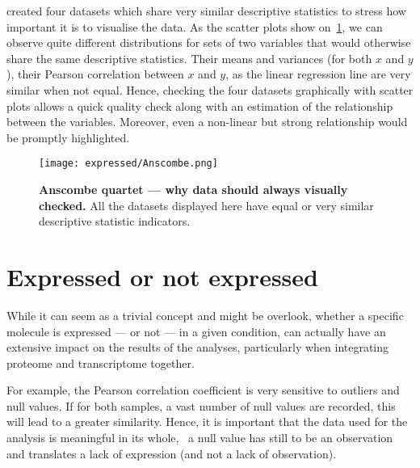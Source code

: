 \cite{anscombe} created four datasets which share very similar descriptive
statistics to stress how important it is to visualise the data. As the scatter
plots show on~\cref{fig:Anscombe}, we can observe quite different distributions
for sets of two variables that would otherwise share the same descriptive
statistics. Their means and variances  (for both $x$ and $y$),
their Pearson correlation between $x$ and $y$, as
the linear regression line are very similar when not equal.
Hence, checking the four datasets graphically with scatter plots
allows a quick quality check along with an
estimation of the relationship between the variables. Moreover, even a non-linear
but strong relationship would be promptly highlighted.

\begin{figure}[!htbp]
    \texttt{[image: expressed/Anscombe.png]}\centering
      \caption[Anscombe quartet --- why data should always visualy checked]
      {\label{fig:Anscombe}\textbf{Anscombe quartet --- why data should always
      visually checked.}\smallbreak{} All the datasets displayed here have equal
      or very similar descriptive statistic indicators.}
\end{figure}

\section{Expressed or not expressed}
\label{sec:ExpressedOrNot}

While it can seem as a trivial concept and might be overlook, whether a specific
molecule is expressed --- or not --- in a given condition, can actually have
an extensive impact on the results of the analyses, particularly when integrating
proteome and transcriptome together.

For example, the Pearson correlation coefficient is very
sensitive to outliers and null values. If for both samples, a vast number of
null values are recorded, this will lead to a greater similarity.
Hence, it is important that the data used for the analysis is meaningful in
its whole, \ie\ a null value has still to be an observation and translates
a lack of expression (and not a lack of observation).

